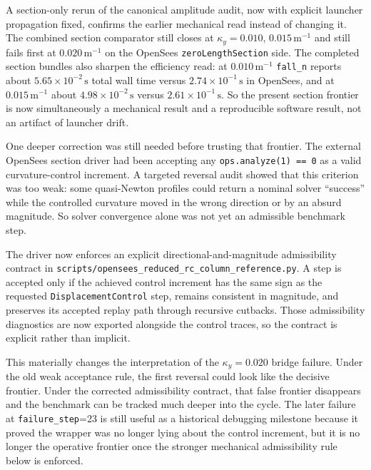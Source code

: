 A section-only rerun of the canonical amplitude audit, now with explicit
launcher propagation fixed, confirms the earlier mechanical read instead of
changing it.  The combined section comparator still closes at
\(\kappa_y = 0.010,\,0.015\,\mathrm{m}^{-1}\) and still fails first at
\(0.020\,\mathrm{m}^{-1}\) on the OpenSees \texttt{zeroLengthSection} side.
The completed section bundles also sharpen the efficiency read: at
\(0.010\,\mathrm{m}^{-1}\) \texttt{fall\_n} reports about
\(5.65\times10^{-2}\,\mathrm{s}\) total wall time versus
\(2.74\times10^{-1}\,\mathrm{s}\) in OpenSees, and at
\(0.015\,\mathrm{m}^{-1}\) about \(4.98\times10^{-2}\,\mathrm{s}\) versus
\(2.61\times10^{-1}\,\mathrm{s}\).  So the present section frontier is now
simultaneously a mechanical result and a reproducible software result, not an
artifact of launcher drift.

One deeper correction was still needed before trusting that frontier.  The
external OpenSees section driver had been accepting any
\texttt{ops.analyze(1) == 0} as a valid curvature-control increment.  A
targeted reversal audit showed that this criterion was too weak: some
quasi-Newton profiles could return a nominal solver ``success'' while the
controlled curvature moved in the wrong direction or by an absurd magnitude.
So solver convergence alone was not yet an admissible benchmark step.

The driver now enforces an explicit directional-and-magnitude admissibility
contract in \texttt{scripts/opensees\_reduced\_rc\_column\_reference.py}.  A
step is accepted only if the achieved control increment has the same sign as
the requested \texttt{DisplacementControl} step, remains consistent in
magnitude, and preserves its accepted replay path through recursive cutbacks.
Those admissibility diagnostics are now exported alongside the control traces,
so the contract is explicit rather than implicit.

This materially changes the interpretation of the \(\kappa_y=0.020\) bridge
failure.  Under the old weak acceptance rule, the first reversal could look
like the decisive frontier.  Under the corrected admissibility contract, that
false frontier disappears and the benchmark can be tracked much deeper into the
cycle. The later failure at \texttt{failure\_step}=23 is still useful as a
historical debugging milestone because it proved the wrapper was no longer
lying about the control increment, but it is no longer the operative frontier
once the stronger mechanical admissibility rule below is enforced.

